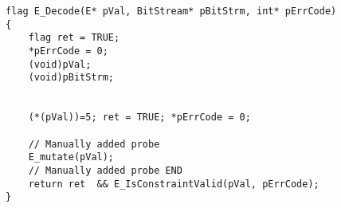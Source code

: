 
\begin{lstlisting}[style=CStyle, caption=Example of manually added ASN.1 data-driven mutation probe., label=ASN_decode]
flag E_Decode(E* pVal, BitStream* pBitStrm, int* pErrCode)
{
    flag ret = TRUE;
    *pErrCode = 0;
    (void)pVal;
    (void)pBitStrm;


    (*(pVal))=5; ret = TRUE; *pErrCode = 0;

    // Manually added probe 
    E_mutate(pVal);
    // Manually added probe END
    return ret  && E_IsConstraintValid(pVal, pErrCode);
}
\end{lstlisting}